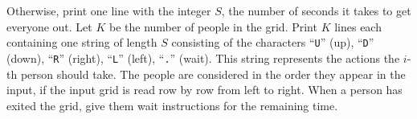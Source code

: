 Otherwise, print one line with the integer $S$, the number of seconds it takes to get everyone out.
Let $K$ be the number of people in the grid. Print $K$ lines each containing one string of length
$S$ consisting of the characters ``\texttt{U}'' (up), ``\texttt{D}'' (down), ``\texttt{R}'' (right), ``\texttt{L}'' (left), ``\texttt{.}'' (wait).
This string represents the actions the $i$-th person should take. The people are considered in the order
they appear in the input, if the input grid is read row by row from left to right. When a person has exited
the grid, give them wait instructions for the remaining time.
